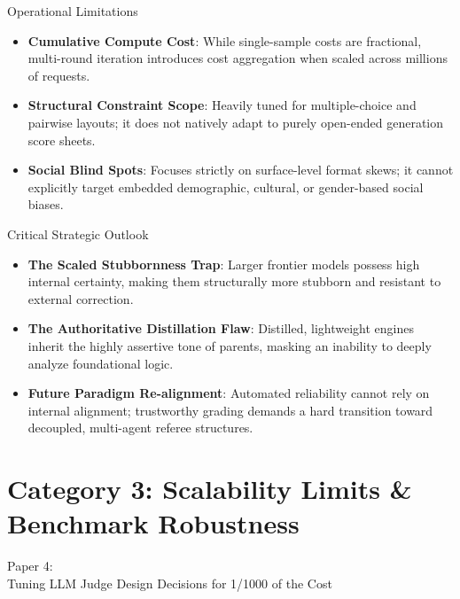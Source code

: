 \documentclass[10pt]{beamer}
\begin{document}
\begin{frame}{Operational Limitations}
  \begin{itemize}
    \item \textbf{Cumulative Compute Cost}: While single-sample costs are fractional, multi-round iteration introduces cost aggregation when scaled across millions of requests.
    \item \textbf{Structural Constraint Scope}: Heavily tuned for multiple-choice and pairwise layouts; it does not natively adapt to purely open-ended generation score sheets.
    \item \textbf{Social Blind Spots}: Focuses strictly on surface-level format skews; it cannot explicitly target embedded demographic, cultural, or gender-based social biases.
  \end{itemize}
\end{frame}

\begin{frame}{Critical Strategic Outlook}
  \begin{itemize}
    \item \textbf{The Scaled Stubbornness Trap}: Larger frontier models possess high internal certainty, making them structurally more stubborn and resistant to external correction.
    \item \textbf{The Authoritative Distillation Flaw}: Distilled, lightweight engines inherit the highly assertive tone of parents, masking an inability to deeply analyze foundational logic.
    \item \textbf{Future Paradigm Re-alignment}: Automated reliability cannot rely on internal alignment; trustworthy grading demands a hard transition toward decoupled, multi-agent referee structures.
  \end{itemize}
\end{frame}

\section{Category 3: Scalability Limits \& Benchmark Robustness}


\begin{frame}[standout]
  \hypertarget{paper4}{}
  \Large Paper 4:\\Tuning LLM Judge Design Decisions for 1/1000 of the Cost
\end{frame}
\end{document}
